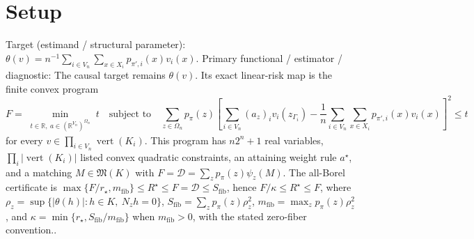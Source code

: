 \documentclass{article}
\begin{document}
\section{Setup}

Target (estimand / structural parameter): \(\theta(v)=n^{-1}\sum_{i\in V_n}\sum_{x\in X_i}p_{\pi',i}(x)v_i(x)\).
Primary functional / estimator / diagnostic: The causal target remains \(\theta(v)\). Its exact linear-risk map is the finite convex program \[ F=\min_{\substack{t\in\mathbb R,\ a\in(\mathbb R^{V_n})^{\Omega_n}}}t\quad\text{subject to}\quad \sum_{z\in\Omega_n}p_{\pi}(z)\left[\sum_{i\in V_n}(a_z)_iv_i(z_{\Gamma_i})-\frac1n\sum_{i\in V_n}\sum_{x\in X_i}p_{\pi',i}(x)v_i(x)\right]^2\le t \] for every \(v\in\prod_{i\in V_n}\operatorname{vert}(K_i)\). This program has \(n2^n+1\) real variables, \(\prod_i|\operatorname{vert}(K_i)|\) listed convex quadratic constraints, an attaining weight rule \(a^{\star}\), and a matching \(M\in\mathfrak M(K)\) with \(F=\mathcal D=\sum_zp_{\pi}(z)\psi_z(M)\). The all-Borel certificate is \(\max\{F/r_{\star},m_{\mathrm{fib}}\}\le R^{\star}\le F=\mathcal D\le S_{\mathrm{fib}}\), hence \(F/\kappa\le R^{\star}\le F\), where \(\rho_z=\sup\{|\theta(h)|:h\in K,\ N_zh=0\}\), \(S_{\mathrm{fib}}=\sum_zp_{\pi}(z)\rho_z^2\), \(m_{\mathrm{fib}}=\max_zp_{\pi}(z)\rho_z^2\), and \(\kappa=\min\{r_{\star},S_{\mathrm{fib}}/m_{\mathrm{fib}}\}\) when \(m_{\mathrm{fib}}>0\), with the stated zero-fiber convention..
\end{document}
